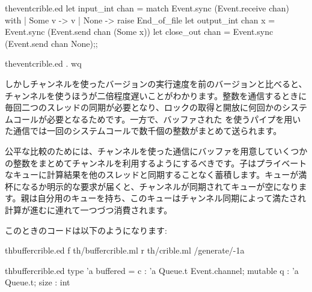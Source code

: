 \begin{example}
\begin{listingcodefile}{theventcrible.ed}
let input_int chan =
  match Event.sync (Event.receive chan) with
  | Some v -> v
  | None -> raise End_of_file
let output_int chan x = Event.sync (Event.send chan (Some x))
let close_out chan = Event.sync (Event.send chan None);;
\end{listingcodefile}
%
\begin{codefile}{theventcrible.ed}
.
wq
\end{codefile}

しかしチャンネルを使ったバージョンの実行速度を前のバージョンと比べると、チャンネルを使うほうが二倍程度遅いことがわかります。整数を通信するときに毎回二つのスレッドの同期が必要となり、ロックの取得と開放に何回かのシステムコールが必要となるためです。一方で、バッファされた \io を使うパイプを用いた通信では一回のシステムコールで数千個の整数がまとめて送られます。

公平な比較のためには、チャンネルを使った通信にバッファを用意していくつかの整数をまとめてチャンネルを利用するようにするべきです。子はプライベートなキューに計算結果を他のスレッドと同期することなく蓄積します。キューが満杯になるか明示的な要求が届くと、チャンネルが同期されてキューが空になります。親は自分用のキューを持ち、このキューはチャンネル同期によって満たされ計算が進むに連れて一つづつ消費されます。

このときのコードは以下のようになります:
%
\begin{codefile}{thbuffercrible.ed}
f th/buffercrible.ml
r th/crible.ml
/generate/-1a
\end{codefile}
%
\begin{listingcodefile}{thbuffercrible.ed}
type 'a buffered =
    { c : 'a Queue.t Event.channel;
      mutable q : 'a Queue.t;
      size : int }


\end{listingcodefile}
\end{example}
